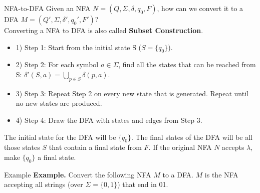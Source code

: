\documentclass[10pt]{beamer}
\begin{document}
\begin{frame}{NFA-to-DFA}
    Given an NFA $N = (Q, \Sigma, \delta, q_0, F)$, how can we convert it to a DFA $M = (Q', \Sigma, \delta', q_0', F')$?\\\bigskip
    Converting a NFA to DFA is also called \textbf{Subset Construction}.\par
    \begin{itemize}
        \item 1) Step 1: Start from the initial state S ($S = \{q_0\}$).
        \item 2) Step 2: For each symbol $a \in \Sigma$, find all the states that can be reached from S: $\delta'(S,a) = \underset{p \in S}\bigcup\delta(p,a)$.
        \item 3) Step 3: Repeat Step 2 on every new state that is generated. Repeat until no new states are produced.
        \item 4) Step 4: Draw the DFA with states and edges from Step 3. \\
    \end{itemize}
    The initial state for the DFA will be $\{q_0\}$. The final states of the DFA will be all those states $S$ that contain a final state from $F$. If the original NFA $N$ accepts $\lambda$, make $\{q_0\}$ a final state.
\end{frame}

\begin{frame}{Example}
    \textbf{Example.} Convert the following NFA $M$ to a DFA. $M$ is the NFA accepting all strings (over $\Sigma = \{0,1\}$) that end in 01.
    \begin{center}
    \end{center}
\end{frame}
\end{document}
